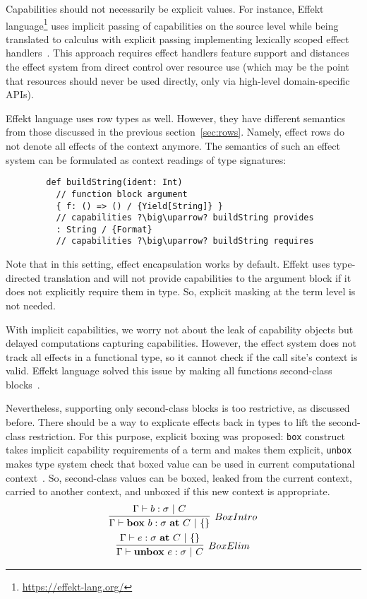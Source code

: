 \documentclass[conference]{IEEEtran}
\newcommand{\ap}{~}
\begin{document}
    Capabilities should not necessarily be explicit values.
    For instance, Effekt language\footnote{\url{https://effekt-lang.org/}} uses implicit passing of capabilities on the source level while being translated to calculus with explicit passing implementing lexically scoped effect handlers~\cite{brachthauser2020effects}.
    This approach requires effect handlers feature support and distances the effect system from direct control over resource use (which may be the point that resources should never be used directly, only via high-level domain-specific APIs).

    Effekt language uses row types as well.
    However, they have different semantics from those discussed in the previous section~\ref{sec:rows}.
    Namely, effect rows do not denote all effects of the context anymore.
    The semantics of such an effect system can be formulated as context readings of type signatures:
    \begin{verbatim}
        def buildString(ident: Int)
          // function block argument
          { f: () => () / {Yield[String]} }
          // capabilities ?\big\uparrow? buildString provides
          : String / {Format}
          // capabilities ?\big\uparrow? buildString requires
    \end{verbatim}

    Note that in this setting, effect encapsulation works by default.
    Effekt uses type-directed translation and will not provide capabilities to the argument block if it does not explicitly require them in type.
    So, explicit masking at the term level is not needed.

    With implicit capabilities, we worry not about the leak of capability objects but delayed computations capturing capabilities.
    However, the effect system does not track all effects in a functional type, so it cannot check if the call site's context is valid.
    Effekt language solved this issue by making all functions second-class blocks~\cite{brachthauser2020effects}.

    Nevertheless, supporting only second-class blocks is too restrictive, as discussed before.
    There should be a way to explicate effects back in types to lift the second-class restriction.
    For this purpose, explicit boxing was proposed:
    \texttt{box} construct takes implicit capability requirements of a term and makes them explicit,
    \texttt{unbox} makes type system check that boxed value can be used in current computational context~\cite{hannan1998type, brachthauser2022effects}.
    So, second-class values can be boxed, leaked from the current context, carried to another context, and unboxed if this new context is appropriate.
    \begin{gather*}
        \infer[BoxIntro]{\Gamma \vdash \mathbf{box}\ap b : \sigma~ \mathbf{at}\ap C ~|~ \{\}}{\Gamma \vdash b : \sigma ~|~ C}
        \\
        \infer[BoxElim]{\Gamma \vdash \mathbf{unbox}\ap e : \sigma ~|~ C}{\Gamma \vdash e : \sigma ~\mathbf{at}~C ~|~ \{\}}
    \end{gather*}
\end{document}
